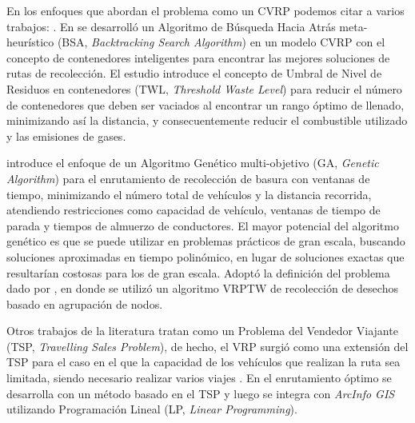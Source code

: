 En los enfoques que abordan el problema como un CVRP podemos citar a varios trabajos: \citet{Akhtar2017BacktrackingOptimization,Ombuki-Berman2007WASTEALGORITHMS,Kim2006WasteWindows,Billa2014GISOptimization,Karadimas2007OptimalAlgorithm}. En \citet{Akhtar2017BacktrackingOptimization} se desarrolló un Algoritmo de Búsqueda Hacia Atrás meta-heurístico (BSA, \textit{Backtracking Search Algorithm}) en un modelo CVRP con el concepto de contenedores inteligentes para encontrar las mejores soluciones de rutas de recolección. El estudio introduce \citep{Akhtar2017BacktrackingOptimization, AbdullaAlMamun2015IntegratedAutomation} el concepto de Umbral de Nivel de Residuos en contenedores (TWL, \textit{Threshold Waste Level}) para reducir el número de contenedores que deben ser vaciados al encontrar un rango óptimo de llenado, minimizando así la distancia, y consecuentemente reducir el combustible utilizado y las emisiones de gases.

\citet{Ombuki-Berman2007WASTEALGORITHMS} introduce el enfoque de un Algoritmo Genético multi-objetivo (GA, \textit{Genetic Algorithm}) para el enrutamiento de recolección de basura con ventanas de tiempo, minimizando el número total de vehículos y la distancia recorrida, atendiendo restricciones como capacidad de vehículo, ventanas de tiempo de parada y tiempos de almuerzo de conductores. El mayor potencial del algoritmo genético es que se puede utilizar en problemas prácticos de gran escala, buscando soluciones aproximadas en tiempo polinómico, en lugar de soluciones exactas que resultarían costosas para los de gran escala. Adoptó la definición del problema dado por \citet{Kim2006WasteWindows}, en donde se utilizó un algoritmo VRPTW de recolección de desechos basado en agrupación de nodos.

Otros trabajos de la literatura tratan como un Problema del Vendedor Viajante (TSP, \textit{Travelling Sales Problem}), de hecho, el VRP surgió como una extensión del TSP para el caso en el que la capacidad de los vehículos que realizan la ruta sea limitada, siendo necesario realizar varios viajes \citep{CalvinoM2011CooperacionPanoramica}. En \citet{Billa2014GISOptimization} el enrutamiento óptimo se desarrolla con un método basado en el TSP y luego se integra con \textit{ArcInfo GIS} utilizando Programación Lineal (LP, \textit{Linear Programming}). 

